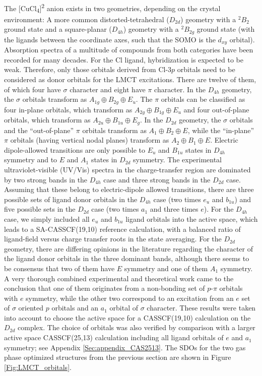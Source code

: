 The [CuCl\textsubscript{4}]\textsuperscript{2\textminus} anion exists in two geometries, depending on the crystal environment: A more common distorted-tetrahedral ($D_{2d}$) geometry with a $^2B_2$ ground state and a square-planar ($D_{4h}$) geometry with a $^2B_{2g}$ ground state (with the ligands between the coordinate axes, such that the SOMO is the $d_{xy}$ orbital).\cite{Smith_1976_93} Absorption spectra of a multitude of compounds from both categories have been recorded for many decades. For the Cl\textsuperscript{\textminus} ligand, hybridization is expected to be weak. Therefore, only those orbitals derived from Cl-$3p$ orbitals need to be considered as donor orbitals for the LMCT excitations. There are twelve of them, of which four have $\sigma $ character and eight have $\pi $ character. In the $D_{4h}$ geometry, the $\sigma$ orbitals transform as ${A_{1g}} \oplus {B_{2g}} \oplus {E_u}$. The $\pi$ orbitals can be classified as four in-plane orbitals, which transform as ${A_{2g}} \oplus {B_{1g}} \oplus {E_u}$ and four out-of-plane orbitals, which transform as ${A_{2u}} \oplus {B_{1u}} \oplus {E_g}$. In the $D_{2d}$ geometry, the $\sigma$ orbitals and the “out-of-plane” $\pi$ orbitals transform as ${A_1} \oplus {B_2} \oplus E$, while the “in-plane” $\pi $ orbitals (having vertical nodal planes) transform as ${A_2} \oplus {B_1} \oplus E$. Electric dipole-allowed transitions are only possible to $E_u$ and $B_{1u}$ states in $D_{4h}$ symmetry and to $E$ and $A_1$ states in $D_{2d}$ symmetry. The experimental ultraviolet-visible (UV/Vis) spectra in the charge-transfer region are dominated by two strong bands in the $D_{4h}$ case and three strong bands in the $D_{2d}$ case. Assuming that these belong to electric-dipole allowed transitions, there are three possible sets of ligand donor orbitals in the $D_{4h}$ case (two times $e_u$ and $b_{1u}$) and five possible sets in the $D_{2d}$ case (two times $a_1$ and three times $e$). For the $D_{4h}$ case, we simply included all $e_u$ and $b_{1u}$ ligand orbitals into the active space, which leads to a SA-CASSCF(19,10) reference calculation, with a balanced ratio of ligand-field versus charge transfer roots in the state averaging. For the $D_{2d}$ geometry, there are differing opinions in the literature regarding the character of the ligand donor orbitals in the three dominant bands, although there seems to be consensus that two of them have $E$ symmetry and one of them $A_1$ symmetry.\cite{BirdD_1968_392, DesjaPCMS_1983_4590} A very thorough combined experimental and theoretical work came to the conclusion that one of them originates from a non-bonding set of $p$-$\pi$ orbitals with $e$ symmetry, while the other two correspond to an excitation from an $e$ set of $\sigma $ oriented $p$ orbitals and an $a_1$ orbital of $\sigma$ character.\cite{DesjaPCMS_1983_4590} These results were taken into account to choose the active space for a CASSCF(19,10) calculation on the $D_{2d}$ complex. The choice of orbitals was also verified by comparison with a larger active space CASSCF(25,13) calculation including all ligand orbitals of $e$ and $a_1$ symmetry; see Appendix \ref{Sec:appendix_CAS2513}. The SDOs for the two gas phase optimized structures from the previous section are shown in Figure \ref{Fig:LMCT_orbitals}.
